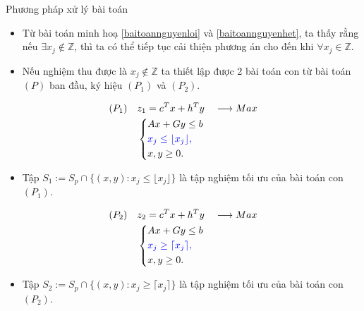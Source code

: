 \documentclass[10pt]{beamer}
\begin{document}
\begin{frame}{Phương pháp xử lý bài toán}
\large
\begin{itemize}
\item<1-> Từ bài toán minh hoạ \eqref{baitoannguyenloi} và \eqref{baitoannguyenhet}, ta thấy rằng nếu $\exists x_j \notin \mathbb{Z}$, thì ta có thể tiếp tục cải thiện phương án cho đến khi $\forall x_j \in \mathbb{Z}$. 
\bigskip
\item<2-> Nếu nghiệm thu được là $x_j \notin \mathbb{Z}$ ta thiết lập được 2 bài toán con từ bài toán $(P)$ ban đầu, ký hiệu $(P_1)$ và $(P_2)$.
\end{itemize}
\end{frame}

\begin{frame}
\begin{equation}
    \begin{split}
    (P_1) \quad & z_1=c^Tx+h^Ty \quad \longrightarrow Max \\
                & \left\{\begin{split}
                    &Ax+Gy \leq  b \\
                    &\color{blue} x_j \leq \lfloor x_j \rfloor , \\
                    &x,y \geq 0.
                \end{split}\right.    
    \end{split}
\end{equation}
\begin{itemize}
\item Tập $S_1:=S_p \cap \{ (x,y): x_j \leq \lfloor x_j \rfloor \}$ là tập nghiệm tối ưu của bài toán con $(P_1)$.
\end{itemize}
\end{frame}

\begin{frame}
\begin{equation}
    \begin{split}
    (P_2) \quad & z_2=c^Tx+h^Ty \quad \longrightarrow Max \\
                & \left\{\begin{split}
                    &Ax+Gy \leq  b \\
                    &\color{blue} x_j \geq \lceil x_j \rceil , \\
                    &x,y \geq 0.
                \end{split}\right.    
    \end{split}
\end{equation}
\begin{itemize}
\item Tập $S_2:=S_p \cap \{ (x,y): x_j \geq \lceil x_j \rceil \}$ là tập nghiệm tối ưu của bài toán con $(P_2)$.
\end{itemize}
\end{frame}
\end{document}
